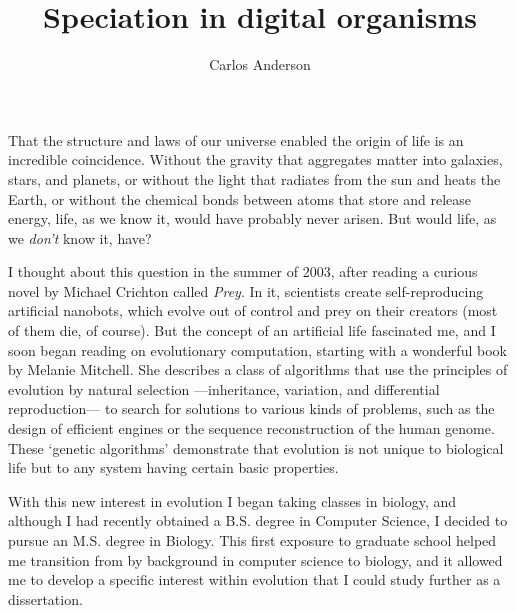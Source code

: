 \documentclass[12pt]{article}
\title{Speciation in digital organisms}
\author{Carlos Anderson}
\begin{document}
\maketitle

\baselineskip 24pt



That the structure and laws of our universe
enabled the origin of life is an incredible coincidence.
%
Without the gravity that aggregates matter into galaxies, stars, and planets,
or without the light that radiates from the sun and heats the Earth,
or without the chemical bonds between atoms that store and release energy,
life, as we know it, would have probably never arisen.
%
But would life, as we \emph{don't} know it, have?



I thought about this question in the summer of 2003,
after reading a curious novel by Michael Crichton called \emph{Prey}.
%
In it, scientists create self-reproducing artificial nanobots,
which evolve out of control and prey on their creators
(most of them die, of course).
%
But the concept of an artificial life fascinated me,
and I soon began reading on evolutionary computation,
starting with a wonderful book by Melanie Mitchell.
%
She describes a class of algorithms
that use the principles of evolution by natural selection%
---inheritance, variation, and differential reproduction---%
to search for solutions to various kinds of problems,
such as the design of efficient engines
or the sequence reconstruction of the human genome.
%
These `genetic algorithms' demonstrate that evolution
is not unique to biological life
but to any system having certain basic properties.



With this new interest in evolution I began taking classes in biology,
and although I had recently obtained a B.S. degree in Computer Science,
I decided to pursue an M.S. degree in Biology.
%
%
%
%
%
This first exposure to graduate school
helped me transition from by background
in computer science to biology,
and it allowed me to develop 
a specific interest within evolution
that I could study further as a dissertation.
\end{document}
